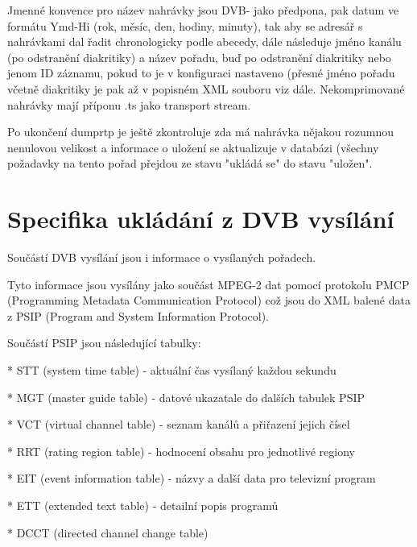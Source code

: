 \vspace{10pt}

Jmenné konvence pro název nahrávky jsou DVB- jako předpona, pak datum ve formátu Ymd-Hi (rok, měsíc, den, hodiny, minuty), tak aby se adresář s nahrávkami dal řadit chronologicky podle abecedy, dále následuje jméno kanálu (po odstranění diakritiky) a název pořadu, buď po odstranění diakritiky nebo jenom ID záznamu, pokud to je v konfiguraci nastaveno (přesné jméno pořadu včetně diakritiky je pak až v popisném XML souboru viz dále. Nekomprimované nahrávky mají příponu .ts jako transport stream.

\vspace{10pt}

Po ukončení dumprtp je ještě zkontroluje zda má nahrávka nějakou rozumnou nenulovou velikost a informace o uložení se aktualizuje v databázi (všechny požadavky na tento pořad přejdou ze stavu "ukládá se" do stavu "uložen".

\vspace{10pt}

\section{Specifika ukládání z DVB vysílání}

\vspace{10pt}

Součástí DVB vysílání jsou i informace o vysílaných pořadech.

Tyto informace jsou vysílány jako součást MPEG-2 dat pomocí protokolu PMCP (Programming Metadata Communication Protocol) což jsou do XML balené data z PSIP (Program and System Information Protocol).

\vspace{10pt}

Součástí PSIP jsou následující tabulky:

* STT (system time table) - aktuální čas vysílaný každou sekundu

* MGT (master guide table) - datové ukazatale do dalších tabulek PSIP

* VCT (virtual channel table) - seznam kanálů a přiřazení jejich čísel

* RRT (rating region table) - hodnocení obsahu pro jednotlivé regiony

* EIT (event information table) - názvy a další data pro televizní program

* ETT (extended text table) - detailní popis programů

* DCCT (directed channel change table)

